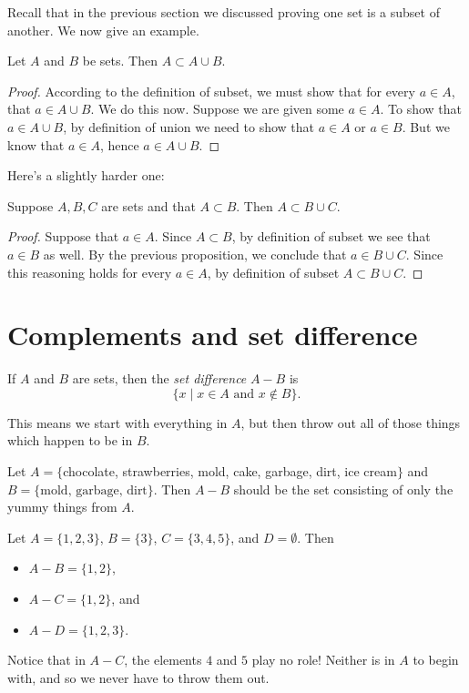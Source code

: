 \documentclass{tufte-book}
\begin{document}
Recall that in the previous section we discussed proving one set is a subset of another. We now give an example.
\begin{proposition}
  Let $A$ and $B$ be sets. Then $A \subset A \cup B$.
\end{proposition}

\begin{proof}
  According to the definition of subset, we must show that for every $a \in A$, that $a \in A \cup B$. We do this now. Suppose we are given some $a \in A$. To show that $a \in A \cup B$, by definition of union we need to show that $a \in A$ or $a \in B$. But we know that $a \in A$, hence $a \in A \cup B$.
\end{proof}

Here's a slightly harder one:
\begin{proposition}
  Suppose $A, B, C$ are sets and that $A \subset B$. Then $A \subset B \cup C$.
\end{proposition}

\begin{proof}
  Suppose that $a \in A$. Since $A \subset B$, by definition of subset we see that $a \in B$ as well. By the previous proposition, we conclude that $a \in B \cup C$. Since this reasoning holds for every $a \in A$, by definition of subset $A \subset B \cup C$.
\end{proof}




\section{Complements and set difference}
\label{sec:compl-set-diff}

\begin{definition}
  If $A$ and $B$ are sets, then the \emph{set difference} $A - B$ is 
  \[
  \{x \mid x \in A \text{ and } x \notin B\}.
  \]
\end{definition}
This means we start with everything in $A$, but then throw out all of those things which happen to be in $B$.

\begin{example}
  Let $A = \{$chocolate, strawberries, mold, cake, garbage, dirt, ice cream$\}$ and $B = \{\text{mold, garbage, dirt}\}$. Then $A - B$ should be the set consisting of only the yummy things from $A$.
\end{example}

\begin{example}
  Let $A = \{1, 2, 3\}$, $B = \{3\}$, $C = \{3, 4, 5\}$, and $D = \emptyset$. Then
  \begin{itemize}
      \item $A - B = \{1, 2\}$,
      \item $A - C = \{1, 2\}$, and
      \item $A - D = \{1, 2, 3\}$.
  \end{itemize}
  Notice that in $A - C$, the elements $4$ and $5$ play no role! Neither is in $A$ to begin with, and so we never have to throw them out.
\end{example}
\end{document}
